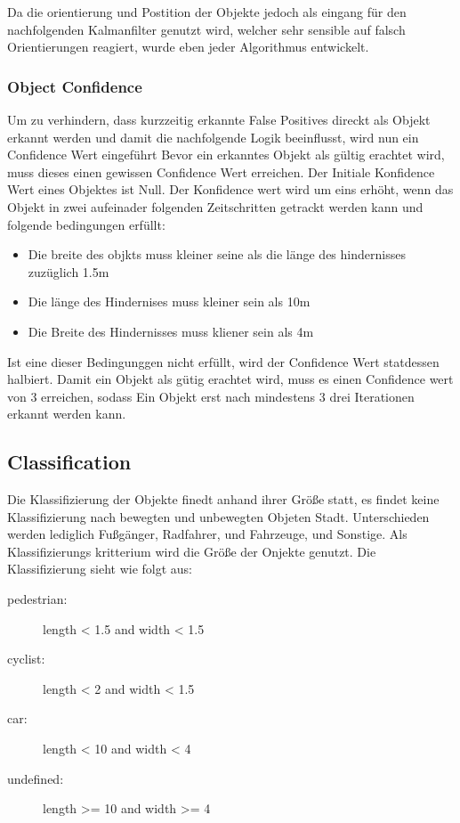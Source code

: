 \documentclass[11pt,oneside,openright]{mpreport}
\begin{document}
Da die orientierung und Postition der Objekte jedoch als eingang für den nachfolgenden Kalmanfilter genutzt wird, welcher sehr sensible auf falsch Orientierungen reagiert, wurde eben jeder Algorithmus
entwickelt.

\subsubsection{Object Confidence}
Um zu verhindern, dass kurzzeitig erkannte False Positives direckt als Objekt erkannt werden und damit die nachfolgende Logik beeinflusst, wird nun ein Confidence Wert eingeführt
Bevor ein erkanntes Objekt als gültig erachtet wird, muss dieses einen gewissen Confidence Wert erreichen. Der Initiale Konfidence Wert eines Objektes ist Null. Der Konfidence wert
wird um eins erhöht, wenn das Objekt in zwei aufeinader folgenden Zeitschritten getrackt werden kann und folgende bedingungen erfüllt: 

\begin{itemize}
\item Die breite des objkts muss kleiner seine als die länge des hindernisses zuzüglich 1.5m
\item Die länge des Hindernises muss kleiner sein als 10m
\item Die Breite des Hindernisses muss kliener sein als 4m
\end{itemize}
Ist eine dieser Bedingunggen nicht erfüllt, wird der Confidence Wert statdessen halbiert. Damit ein Objekt als gütig erachtet wird, muss es einen Confidence wert von 3 erreichen, sodass
Ein Objekt erst nach mindestens 3 drei Iterationen erkannt werden kann.



\subsection{Classification}
Die Klassifizierung der Objekte finedt anhand ihrer Größe statt, es findet keine Klassifizierung nach bewegten und unbewegten Objeten Stadt.
Unterschieden werden lediglich Fußgänger, Radfahrer, und Fahrzeuge, und Sonstige. Als Klassifizierungs kritterium wird die Größe der Onjekte genutzt.
Die Klassifizierung sieht wie folgt aus:
\begin{description}
\item[pedestrian:] length < 1.5 and width < 1.5
\item[cyclist:] length < 2 and width < 1.5
\item[car:] length < 10 and width < 4
\item[undefined:] length >= 10 and width >= 4
\end{description}
\end{document}
